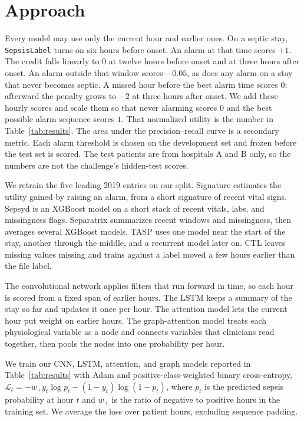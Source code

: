 \documentclass{article}
\begin{document}
\section{Approach}
\label{sec:approach}
Every model may use only the current hour and earlier ones. On a septic stay, \texttt{SepsisLabel} turns on six hours before onset. An alarm at that time scores $+1$. The credit falls linearly to $0$ at twelve hours before onset and at three hours after onset. An alarm outside that window scores $-0.05$, as does any alarm on a stay that never becomes septic. A missed hour before the best alarm time scores $0$; afterward the penalty grows to $-2$ at three hours after onset. We add these hourly scores and scale them so that never alarming scores $0$ and the best possible alarm sequence scores $1$. That normalized utility is the number in Table~\ref{tab:results}. The area under the precision--recall curve is a secondary metric. Each alarm threshold is chosen on the development set and frozen before the test set is scored. The test patients are from hospitals A and B only, so the numbers are not the challenge's hidden-test scores.

We retrain the five leading 2019 entries on our split. Signature \cite{morrill2019signature} estimates the utility gained by raising an alarm, from a short signature of recent vital signs. Sepsyd \cite{du2019sepsyd} is an XGBoost model \cite{chen2016xgboost} on a short stack of recent vitals, labs, and missingness flags. Separatrix \cite{zabihi2019separatrix} summarizes recent windows and missingness, then averages several XGBoost models. TASP \cite{li2019tasp} uses one model near the start of the stay, another through the middle, and a recurrent model later on. CTL \cite{singh2019ctl} leaves missing values missing and trains against a label moved a few hours earlier than the file label.

The convolutional network applies filters that run forward in time, so each hour is scored from a fixed span of earlier hours. The LSTM keeps a summary of the stay so far and updates it once per hour. The attention model lets the current hour put weight on earlier hours. The graph-attention model \cite{velickovic2018graph} treats each physiological variable as a node and connects variables that clinicians read together, then pools the nodes into one probability per hour.

We train our CNN, LSTM, attention, and graph models reported in Table~\ref{tab:results} with Adam \cite{kingma2015adam} and positive-class-weighted binary cross-entropy, $\mathcal{L}_t=-w_+y_t\log p_t-(1-y_t)\log(1-p_t)$, where $p_t$ is the predicted sepsis probability at hour $t$ and $w_+$ is the ratio of negative to positive hours in the training set. We average the loss over patient hours, excluding sequence padding.
\end{document}

